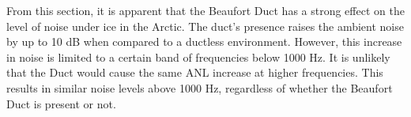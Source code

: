 From this section, it is apparent that the Beaufort Duct has a strong effect on the level of noise under ice in the Arctic. The duct's presence raises the ambient noise by up to 10 dB when compared to a ductless environment. However, this increase in noise is limited to a certain band of frequencies below 1000 Hz. It is unlikely that the Duct would cause the same ANL increase at higher frequencies. This results in similar noise levels above 1000 Hz, regardless of whether the Beaufort Duct is present or not.

